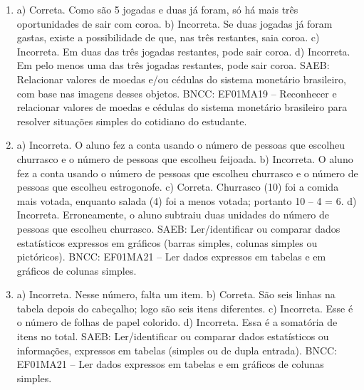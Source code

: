 \begin{enumerate}
\item
a) Correta. Como são 5 jogadas e duas já foram, só há mais
três oportunidades de sair com coroa.
b) Incorreta. Se duas jogadas já foram gastas, existe a possibilidade de que, nas três restantes, saia coroa.
c) Incorreta. Em duas das três jogadas restantes, pode sair coroa.
d) Incorreta. Em pelo menos uma das três jogadas restantes, pode sair coroa.
SAEB: Relacionar valores de moedas e/ou cédulas do sistema
monetário brasileiro, com base nas imagens desses objetos.
BNCC: EF01MA19 -- Reconhecer e relacionar valores de moedas e cédulas do
sistema monetário brasileiro para resolver situações simples do
cotidiano do estudante.

\item
a) Incorreta. O aluno fez a conta usando o número de pessoas que escolheu churrasco e o número de pessoas que escolheu feijoada.
b) Incorreta. O aluno fez a conta usando o número de pessoas que escolheu churrasco e o número de pessoas que escolheu estrogonofe.
c) Correta. Churrasco (10) foi a comida mais votada, enquanto salada (4) foi a menos votada; portanto 10 -- 4 = 6.
d) Incorreta. Erroneamente, o aluno subtraiu duas unidades do número de pessoas que escolheu churrasco.
SAEB: Ler/identificar ou comparar dados estatísticos expressos
em gráficos (barras simples, colunas simples ou pictóricos).
BNCC: EF01MA21 -- Ler dados expressos em tabelas e em gráficos de colunas
simples.

\item
a) Incorreta. Nesse número, falta um item.
b) Correta. São seis linhas na tabela depois do cabeçalho; logo são seis itens diferentes.
c) Incorreta. Esse é o número de folhas de papel colorido.
d) Incorreta. Essa é a somatória de itens no total.
SAEB: Ler/identificar ou comparar dados estatísticos ou
informações, expressos em tabelas (simples ou de dupla entrada).
BNCC: EF01MA21 -- Ler dados expressos em tabelas e em gráficos de colunas
simples.
\end{enumerate}